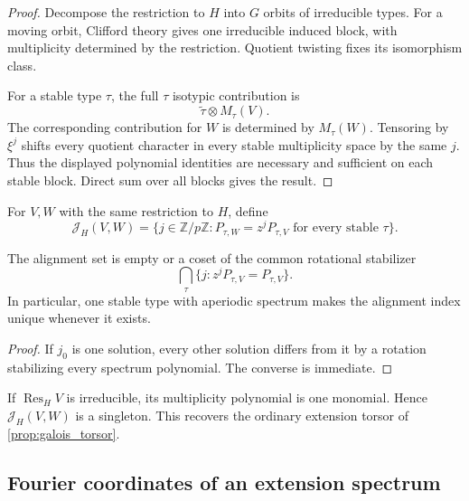 \documentclass{aomart}
\theoremstyle{definition}
\theoremstyle{remark}
\newcommand{\ZZ}{\mathbb Z}
\newcommand{\Res}{\operatorname{Res}}
\newcommand{\calJ}{\mathcal J}
\begin{document}
\begin{proof}
Decompose the restriction to \(H\) into \(G\) orbits of irreducible types. For a moving orbit, Clifford theory gives one irreducible induced block, with multiplicity determined by the restriction. Quotient twisting fixes its isomorphism class.

For a stable type \(\tau\), the full \(\tau\) isotypic contribution is
\[
 \widetilde\tau\otimes M_\tau(V).
\]
The corresponding contribution for \(W\) is determined by \(M_\tau(W)\). Tensoring by \(\xi^j\) shifts every quotient character in every stable multiplicity space by the same \(j\). Thus the displayed polynomial identities are necessary and sufficient on each stable block. Direct sum over all blocks gives the result.
\end{proof}

\begin{definition}\label{def:alignment_set}
For \(V,W\) with the same restriction to \(H\), define
\[
 \boxed{
 \calJ_H(V,W)
 =
 \{j\in\ZZ/p\ZZ:
 P_{\tau,W}=z^jP_{\tau,V}
 \text{ for every stable }\tau\}.
 }
\]
\end{definition}

\begin{corollary}\label{cor:alignment_coset}
The alignment set is empty or a coset of the common rotational stabilizer
\[
 \bigcap_\tau
 \{j:z^jP_{\tau,V}=P_{\tau,V}\}.
\]
In particular, one stable type with aperiodic spectrum makes the alignment index unique whenever it exists.
\end{corollary}

\begin{proof}
If \(j_0\) is one solution, every other solution differs from it by a rotation stabilizing every spectrum polynomial. The converse is immediate.
\end{proof}

\begin{example}\label{ex:irreducible_stable}
If \(\Res_HV\) is irreducible, its multiplicity polynomial is one monomial. Hence \(\calJ_H(V,W)\) is a singleton. This recovers the ordinary extension torsor of \cref{prop:galois_torsor}.
\end{example}



\subsection{Fourier coordinates of an extension spectrum}
\end{document}
